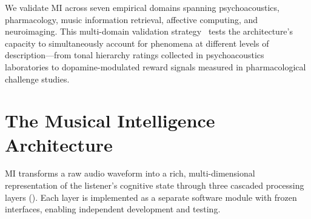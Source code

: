 \documentclass[twocolumn,10pt]{article}
\begin{document}
We validate MI across seven empirical domains spanning psychoacoustics, pharmacology, music information retrieval, affective computing, and neuroimaging. This multi-domain validation strategy~\citep{kriegeskorte2008} tests the architecture's capacity to simultaneously account for phenomena at different levels of description---from tonal hierarchy ratings collected in psychoacoustics laboratories to dopamine-modulated reward signals measured in pharmacological challenge studies.

\section{The Musical Intelligence Architecture}
\label{sec:architecture}

MI transforms a raw audio waveform into a rich, multi-dimensional representation of the listener's cognitive state through three cascaded processing layers (). Each layer is implemented as a separate software module with frozen interfaces, enabling independent development and testing.
\end{document}
